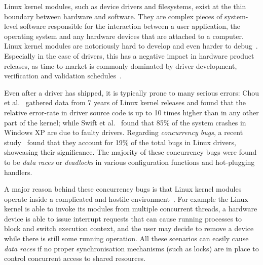 Linux kernel modules, such as device drivers and filesystems, exist at the thin boundary between hardware and software. They are complex pieces of system-level software responsible for the interaction between a user application, the operating system and any hardware devices that are attached to a computer. Linux kernel modules are notoriously hard to develop and even harder to debug~\cite{corbet2005linux}. Especially in the case of drivers, this has a negative impact in hardware product releases, as time-to-market is commonly dominated by driver development, verification and validation schedules~\cite{yavatkar2012era}.

Even after a driver has shipped, it is typically prone to many serious errors: Chou et al.~\cite{chou2001empirical} gathered data from 7 years of Linux kernel releases and found that the relative error-rate in driver source code is up to 10 times higher than in any other part of the kernel; while Swift et al.~\cite{Swift2003windowsxp} found that 85\% of the system crashes in Windows XP are due to faulty drivers. Regarding \emph{concurrency bugs}, a recent study~\cite{ryzhyk2009dingo} found that they account for 19\% of the total bugs in Linux drivers, showcasing their significance. The majority of these concurrency bugs were found to be \emph{data races} or \emph{deadlocks} in various configuration functions and hot-plugging handlers.

A major reason behind these concurrency bugs is that Linux kernel modules operate inside a complicated and hostile environment~\cite{corbet2005linux}. For example the Linux kernel is able to invoke its modules from multiple concurrent threads, a hardware device is able to issue interrupt requests that can cause running processes to block and switch execution context, and the user may decide to remove a device while there is still some running operation. All these scenarios can easily cause \emph{data races} if no proper synchronisation mechanisms (such as locks) are in place to control concurrent access to shared resources.

